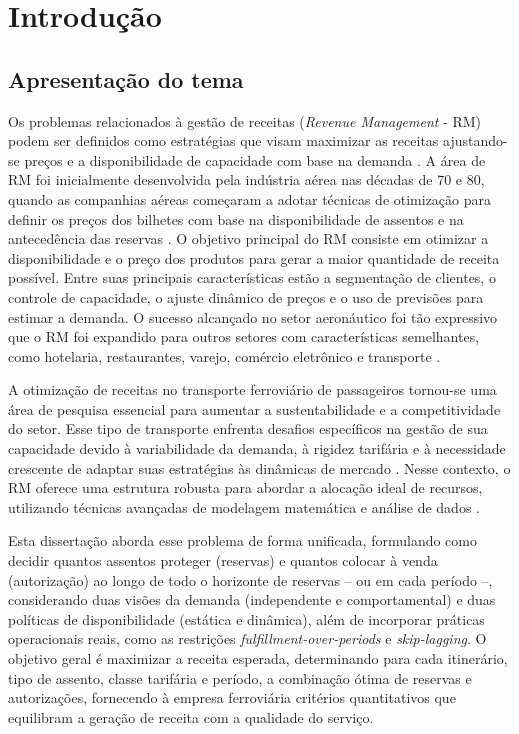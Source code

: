 \chapter{Introdução}



\section{Apresentação do tema}

Os problemas relacionados à gestão de receitas (\textit{Revenue Management} - RM) podem ser definidos como estratégias que visam maximizar as receitas ajustando-se preços e a disponibilidade de capacidade com base na demanda \citep{Gallego1994}. A área de RM foi inicialmente desenvolvida pela indústria aérea nas décadas de 70 e 80, quando as companhias aéreas começaram a adotar técnicas de otimização para definir os preços dos bilhetes com base na disponibilidade de assentos e na antecedência das reservas \citep{article_base}. O objetivo principal do RM consiste em otimizar a disponibilidade e o preço dos produtos para gerar a maior quantidade de receita possível. Entre suas principais características estão a segmentação de clientes, o controle de capacidade, o ajuste dinâmico de preços e o uso de previsões para estimar a demanda. O sucesso alcançado no setor aeronáutico foi tão expressivo que o RM foi expandido para outros setores com características semelhantes, como hotelaria, restaurantes, varejo, comércio eletrônico e transporte \citep{HEO2009446}.

A otimização de receitas no transporte ferroviário de passageiros tornou-se uma área de pesquisa essencial para aumentar a sustentabilidade e a competitividade do setor. Esse tipo de transporte enfrenta desafios específicos na gestão de sua capacidade devido à variabilidade da demanda, à rigidez tarifária e à necessidade crescente de adaptar suas estratégias às dinâmicas de mercado \citep{Guerriero2021}. Nesse contexto, o RM oferece uma estrutura robusta para abordar a alocação ideal de recursos, utilizando técnicas avançadas de modelagem matemática e análise de dados \citep{Ammirato2020}.


Esta dissertação aborda esse problema de forma unificada, formulando como decidir quantos assentos proteger (reservas) e quantos colocar à venda (autorização) ao longo de todo o horizonte de reservas – ou em cada período –, considerando duas visões da demanda (independente e comportamental) e duas políticas de disponibilidade (estática e dinâmica), além de incorporar práticas operacionais reais, como as restrições \textit{fulfillment-over-periods} e \textit{skip-lagging}. O objetivo geral é maximizar a receita esperada, determinando para cada itinerário, tipo de assento, classe tarifária e período, a combinação ótima de reservas e autorizações, fornecendo à empresa ferroviária critérios quantitativos que equilibram a geração de receita com a qualidade do serviço.

